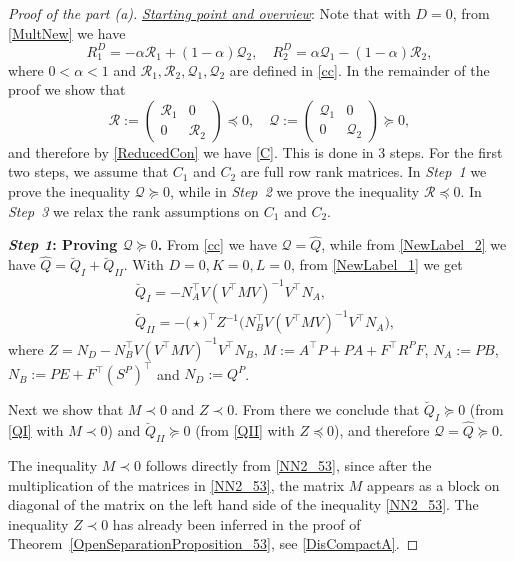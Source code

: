 \documentclass[11pt,a4paper,oneside,DIV=12,headings=small]{scrartcl}
\newcommand{\cQ}{\mathcal{Q}}
\newcommand{\cR}{\mathcal{R}}
\theoremstyle{plain}
\begin{document}
\begin{proof}[Proof of the part (a)]
\underline{\emph{Starting point and overview}}:
Note that with $D=0$, from \eqref{MultNew} we have
\begin{equation}
\label{ReducedCon}
R^D_1=-\alpha \cR_1 + (1-\alpha) \cQ_2, \quad R^D_2=\alpha \cQ_1 - (1-\alpha) \cR_2,
\end{equation}
where $0<\alpha<1$ and $\cR_1, \cR_2, \cQ_1, \cQ_2$ are defined in \eqref{cc}.
In the remainder of the proof we show that
\begin{equation}
\cR:=\begin{pmatrix} \cR_1 & 0 \\ 0 & \cR_2 \end{pmatrix} \preceq 0, \quad \cQ:=\begin{pmatrix} \cQ_1 & 0 \\ 0 & \cQ_2 \end{pmatrix} \succeq 0, 
\end{equation}
and therefore by \eqref{ReducedCon} we have \eqref{C}. This is done in 3 steps. For the first two steps, we assume that $C_1$ and $C_2$ are full row rank matrices. In \emph{Step~1} we prove the inequality $\cQ\succeq 0$, while in \emph{Step~2} we prove the inequality $\cR\preceq 0$. In \emph{Step~3} we relax the rank assumptions on $C_1$ and $C_2$.

\medskip

\textbf{\emph{Step 1}: Proving $\cQ\succeq 0$.} \newline  
From \eqref{cc} we have $\cQ=\hat{Q}$, while from \eqref{NewLabel_2} we have $\hat{Q}=\breve{Q}_{I} +\breve{Q}_{II}$. With $D=0, K=0, L=0$, from \eqref{NewLabel_1} we get 
\begin{subequations}
\label{Qdef}
\begin{align}
& \breve{Q}_I=-N_A^\top V (V^\top M V)^{-1} V^\top N_A, \label{QI} \\
& \breve{Q}_{II}=-\Big(\star \Big)^\top Z^{-1}\Big(N_B^\top V (V^\top M V)^{-1} V^\top N_A \Big), \label{QII}
\end{align}
\end{subequations}
where $Z =N_D-N_B^\top V (V^\top M V)^{-1} V^\top N_B $, $M:=A^\top P+PA+F^\top R^P F$, $N_A:=PB$, $N_B:=PE+F^\top(S^P)^\top$ and $N_D:=Q^P$.

Next we show that $M \prec 0$ and $Z \prec 0$. From there we conclude that $\breve{Q}_I \succeq 0$ (from  \eqref{QI} with $M \prec 0$) and $\breve{Q}_{II} \succeq 0$ (from \eqref{QII} with $Z \preceq 0$), and therefore $\cQ=\hat{Q} \succeq 0$.

The inequality $M \prec 0$ follows directly from \eqref{NN2_53}, since after the multiplication of the matrices in \eqref{NN2_53}, the matrix $M$ appears as a block on diagonal of the matrix on the left hand side of the inequality \eqref{NN2_53}.
The inequality $Z \prec 0$ has already been inferred in the proof of Theorem~\ref{OpenSeparationProposition_53}, see \eqref{DisCompactA}.  
   

\end{proof}
\end{document}
